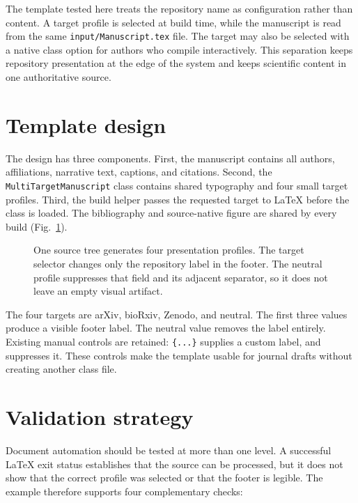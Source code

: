 \documentclass[times,twoside]{_Templates/MultiTargetManuscript}
\begin{document}
The template tested here treats the repository name as configuration rather than
content. A target profile is selected at build time, while the manuscript is read
from the same \texttt{input/Manuscript.tex} file. The target may also be selected with
a native class option for authors who compile interactively. This separation
keeps repository presentation at the edge of the system and keeps scientific
content in one authoritative source.

\section*{Template design}

The design has three components. First, the manuscript contains all authors,
affiliations, narrative text, captions, and citations. Second, the
\texttt{MultiTargetManuscript} class contains shared typography and four small
target profiles. Third, the build helper passes the requested target to LaTeX
before the class is loaded. The bibliography and source-native figure are shared
by every build (Fig.~\ref{fig:workflow}).

\begin{figure}[!t]
  \centering
  
  \caption{One source tree generates four presentation profiles. The target
  selector changes only the repository label in the footer. The neutral profile
  suppresses that field and its adjacent separator, so it does not leave an
  empty visual artifact.}
  \label{fig:workflow}
\end{figure}

The four targets are arXiv, bioRxiv, Zenodo, and neutral. The first three values
produce a visible footer label. The neutral value removes the label entirely.
Existing manual controls are retained:
\texttt{\string\journalname\{...\}} supplies a custom label, and
\texttt{\string\nojournalname} suppresses it. These controls make the template
usable for journal drafts without creating another class file.

\section*{Validation strategy}

Document automation should be tested at more than one level. A successful LaTeX
exit status establishes that the source can be processed, but it does not show
that the correct profile was selected or that the footer is legible. The example
therefore supports four complementary checks:
\end{document}

